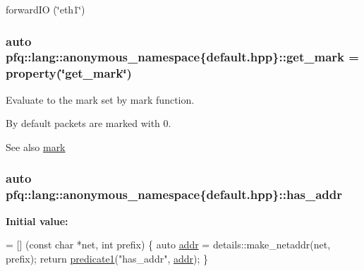 forward\+I\+O (\char`\"{}eth1\char`\"{}) \hypertarget{namespacepfq_1_1lang_1_1anonymous__namespace_02default_8hpp_03_ab733e24b3ca86450bea0b0888a6327d2}{
\subsubsection[{get\+\_\+mark}]{\setlength{\rightskip}{0pt plus 5cm}auto pfq\+::lang\+::anonymous\+\_\+namespace\{default.\+hpp\}\+::get\+\_\+mark = {\bf property}(\char`\"{}get\+\_\+mark\char`\"{})}}\label{namespacepfq_1_1lang_1_1anonymous__namespace_02default_8hpp_03_ab733e24b3ca86450bea0b0888a6327d2}


Evaluate to the mark set by {\ttfamily mark} function. 

By default packets are marked with 0.

\begin{DoxySeeAlso}{See also}
\hyperlink{namespacepfq_1_1lang_1_1anonymous__namespace_02default_8hpp_03_a7b831baeabda070b89ca862a9445a4a8}{mark} 
\end{DoxySeeAlso}
\hypertarget{namespacepfq_1_1lang_1_1anonymous__namespace_02default_8hpp_03_a74c6b7e812fb3d312ebf534960a6a91d}{
\subsubsection[{has\+\_\+addr}]{\setlength{\rightskip}{0pt plus 5cm}auto pfq\+::lang\+::anonymous\+\_\+namespace\{default.\+hpp\}\+::has\+\_\+addr}}\label{namespacepfq_1_1lang_1_1anonymous__namespace_02default_8hpp_03_a74c6b7e812fb3d312ebf534960a6a91d}
{\bfseries Initial value\+:}
\begin{DoxyCode}
= [] (\textcolor{keyword}{const} \textcolor{keywordtype}{char} *net, \textcolor{keywordtype}{int} prefix)
        \{
            \textcolor{keyword}{auto} \hyperlink{namespacepfq_1_1lang_1_1anonymous__namespace_02default_8hpp_03_a13cabe468839119d8d68540e3c60718b}{addr} = details::make\_netaddr(net, prefix);
            \textcolor{keywordflow}{return} \hyperlink{namespacepfq_1_1lang_a3e018f096545ca95a68e67027c8e3144}{predicate1}(\textcolor{stringliteral}{"has\_addr"}, \hyperlink{namespacepfq_1_1lang_1_1anonymous__namespace_02default_8hpp_03_a13cabe468839119d8d68540e3c60718b}{addr});
        \}
\end{DoxyCode}


